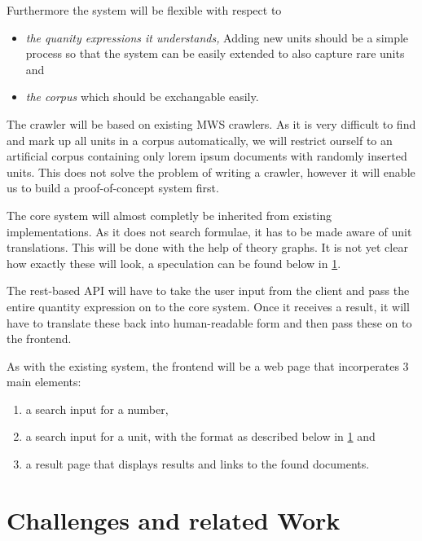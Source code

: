 \documentclass[11pt]{article}
\begin{document}
Furthermore the system will be flexible with respect to
\begin{itemize}
  \item \textit{the quanity expressions it understands, } Adding new units should be a simple process so that the system can be easily extended to also capture rare units and
  \item \textit{the corpus} which should be exchangable easily.
\end{itemize}

The crawler will be based on existing MWS crawlers. As it is very difficult to find and mark up all units in a corpus automatically, we will restrict ourself to an artificial corpus containing only lorem ipsum documents with randomly inserted units. This does not solve the problem of writing a crawler, however it will enable us to build a proof-of-concept system first.

The core system will almost completly be inherited from existing implementations. As it does not search formulae, it has to be made aware of unit translations. This will be done with the help of theory graphs. It is not yet clear how exactly these will look, a speculation can be found below in \ref{sec:problems_relatedwork}.

The rest-based API will have to take the user input from the client and pass the entire quantity expression on to the core system. Once it receives a result, it will have to translate these back into human-readable form and then pass these on to the frontend.

As with the existing system, the frontend will be a web page that incorperates 3 main elements:

\begin{enumerate}
  \item a search input for a number,
  \item a search input for a unit, with the format as described below in \ref{sec:problems_relatedwork} and
  \item a result page that displays results and links to the found documents.
\end{enumerate}


\section{Challenges and related Work}
\label{sec:problems_relatedwork}
\end{document}
